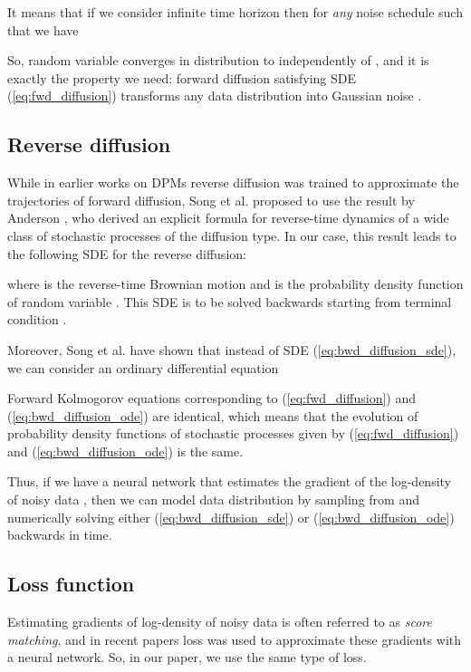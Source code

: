 \documentclass{article}
\begin{document}
It means that if we consider infinite time horizon then for \textit{any} noise schedule  such that  we have



So, random variable  converges in distribution to  independently of , and it is exactly the property we need: forward diffusion satisfying SDE (\ref{eq:fwd_diffusion}) transforms any data distribution  into Gaussian noise  .

\subsection{Reverse diffusion}
\label{subsec:rev_diffusion}

While in earlier works on DPMs reverse diffusion was trained to approximate the trajectories of forward diffusion, Song et al.  proposed to use the result by Anderson , who derived an explicit formula for reverse-time dynamics of a wide class of stochastic processes of the diffusion type. In our case, this result leads to the following SDE for the reverse diffusion:



where  is the reverse-time Brownian motion and  is the probability density function of random variable . This SDE is to be solved backwards starting from terminal condition .

Moreover, Song et al.  have shown that instead of SDE (\ref{eq:bwd_diffusion_sde}), we can consider an ordinary differential equation



Forward Kolmogorov equations corresponding to (\ref{eq:fwd_diffusion}) and (\ref{eq:bwd_diffusion_ode}) are identical, which means that the evolution of probability density functions of stochastic processes given by (\ref{eq:fwd_diffusion}) and (\ref{eq:bwd_diffusion_ode}) is the same.

Thus, if we have a neural network  that estimates the gradient of the log-density of noisy data , then we can model data distribution  by sampling  from  and numerically solving either (\ref{eq:bwd_diffusion_sde}) or (\ref{eq:bwd_diffusion_ode}) backwards in time.

\subsection{Loss function}
\label{subsec:loss}

Estimating gradients of log-density of noisy data  is often referred to as \textit{score matching}, and in recent papers \cite{ScoreBasedGeneration, ScoreBasedImproved}  loss was used to approximate these gradients with a neural network. So, in our paper, we use the same type of loss.
\end{document}
